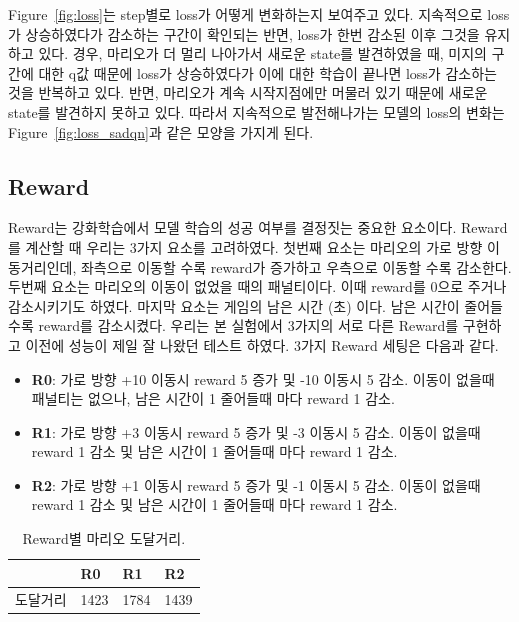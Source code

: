 Figure~\ref{fig:loss}는 step별로   loss가 어떻게 변화하는지 보여주고 있다.
 지속적으로 loss가 상승하였다가 감소하는 구간이 확인되는 반면,  loss가 한번 감소된 이후 그것을 유지하고 있다.
 경우, 마리오가 더 멀리 나아가서 새로운 state를 발견하였을 때, 미지의 구간에 대한 q값 때문에 loss가 상승하였다가 이에 대한 학습이 끝나면 loss가 감소하는 것을 반복하고 있다.
반면,  마리오가 계속 시작지점에만 머물러 있기 때문에 새로운 state를 발견하지 못하고 있다.
따라서 지속적으로 발전해나가는 모델의 loss의 변화는 Figure~\ref{fig:loss_sadqn}과 같은 모양을 가지게 된다.

\subsection{Reward}
\label{sec:exp:reward}
Reward는 강화학습에서 모델 학습의 성공 여부를 결정짓는 중요한 요소이다.
Reward를 계산할 때 우리는 3가지 요소를 고려하였다.
첫번째 요소는 마리오의 가로 방향 이동거리인데, 좌측으로 이동할 수록 reward가 증가하고 우측으로 이동할 수록 감소한다.
두번째 요소는 마리오의 이동이 없었을 때의 패널티이다.
이때 reward를 0으로 주거나 감소시키기도 하였다.
마지막 요소는 게임의 남은 시간 (초) 이다. 남은 시간이 줄어들 수록 reward를 감소시켰다.
우리는 본 실험에서 3가지의 서로 다른 Reward를 구현하고 이전에 성능이 제일 잘 나왔던  테스트 하였다.
3가지 Reward 세팅은 다음과 같다.
\begin{itemize}
	\item \textbf{R0}:
		가로 방향 +10 이동시 reward 5 증가 및 -10 이동시 5 감소. 이동이 없을때 패널티는 없으나, 남은 시간이 1 줄어들때 마다 reward 1 감소.
	\item \textbf{R1}:
		가로 방향 +3 이동시 reward 5 증가 및 -3 이동시 5 감소. 이동이 없을때 reward 1 감소 및 남은 시간이 1 줄어들때 마다 reward 1 감소.
	\item \textbf{R2}:
		가로 방향 +1 이동시 reward 5 증가 및 -1 이동시 5 감소. 이동이 없을때 reward 1 감소 및 남은 시간이 1 줄어들때 마다 reward 1 감소.
\end{itemize}

\begin{table}[h]
\centering
\caption {
	Reward별  마리오 도달거리.
}
\label{tab:reward}
\begin{tabular}{llll}
\toprule
     & R0  & R1 & R2 \\
\midrule
도달거리 & 1423 & 1784  & 1439  \\
\bottomrule
\end{tabular}
\end{table}


